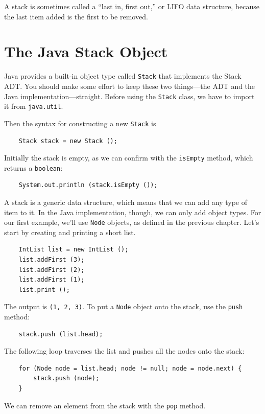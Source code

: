 \documentclass[12pt]{book}
\theoremstyle{exercise}
\begin{document}
A stack is sometimes called a ``last in, first out,'' or LIFO
data structure, because the last item added is the first to
be removed.


\section {The Java Stack Object}

Java provides a built-in object type called {\tt Stack} that
implements the Stack ADT.  You should make some effort to keep
these two things---the ADT and the Java implementation---straight.
Before using the {\tt Stack} class, we have to import it from
{\tt java.util}.

Then the syntax for constructing a new {\tt Stack} is

\begin{verbatim}
    Stack stack = new Stack ();
\end{verbatim}
%
Initially the stack is empty, as we can confirm with the
{\tt isEmpty} method, which returns a {\tt boolean}:

\begin{verbatim}
    System.out.println (stack.isEmpty ());
\end{verbatim}
%
A stack is a generic data structure, which means that we can
add any type of item to it.  In the Java implementation, though,
we can only add object types.  For our first example, we'll
use {\tt Node} objects, as defined in the previous chapter.
Let's start by creating and printing a short list.

\begin{verbatim}
    IntList list = new IntList ();
    list.addFirst (3);
    list.addFirst (2);
    list.addFirst (1);
    list.print ();
\end{verbatim}
%
The output is {\tt (1, 2, 3)}.  To put a {\tt Node} object onto
the stack, use the {\tt push} method:

\begin{verbatim}
	stack.push (list.head);
\end{verbatim}
%
The following loop traverses the list and pushes all the nodes
onto the stack:

\begin{verbatim}
    for (Node node = list.head; node != null; node = node.next) {
        stack.push (node);
    }
\end{verbatim}
%
We can remove an element from the stack with the {\tt pop} method.
\end{document}
